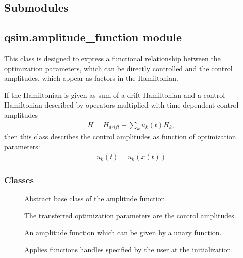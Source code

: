 \documentclass[letterpaper,10pt,english]{sphinxmanual}
\begin{document}
\subsection{Submodules}
\label{\detokenize{qsim:submodules}}

\subsection{qsim.amplitude\_function module}
\label{\detokenize{qsim:module-qsim.amplitude_functions}}\label{\detokenize{qsim:qsim-amplitude-function-module}}
This class is designed to express a functional relationship between the
optimization parameters, which can be directly controlled and the control
amplitudes, which appear as factors in the Hamiltonian.

If the Hamiltonian is given as sum of a drift Hamiltonian and a control
Hamiltonian described by operators multiplied with time dependent control
amplitudes
\begin{equation*}
\begin{split}H = H_{drift} + \sum_k u_k(t) H_k,\end{split}
\end{equation*}
then this class describes the control amplitudes as function of optimization
parameters:
\begin{equation*}
\begin{split}u_k(t) = u_k(x(t))\end{split}
\end{equation*}

\subsubsection{Classes}
\label{\detokenize{qsim:classes}}\begin{description}
\item[{{\hyperref[\detokenize{qsim:qsim.amplitude_functions.AmplitudeFunction}]{}}}] \leavevmode
Abstract base class of the amplitude function.

\item[{{\hyperref[\detokenize{qsim:qsim.amplitude_functions.IdentityAmpFunc}]{}}}] \leavevmode
The transferred optimization parameters are the control amplitudes.

\item[{{\hyperref[\detokenize{qsim:qsim.amplitude_functions.UnaryAnalyticAmpFunc}]{}}}] \leavevmode
An amplitude function which can be given by a unary function.

\item[{{\hyperref[\detokenize{qsim:qsim.amplitude_functions.CustomAmpFunc}]{}}}] \leavevmode
Applies functions handles specified by the user at the initialization.

\end{description}
\end{document}
